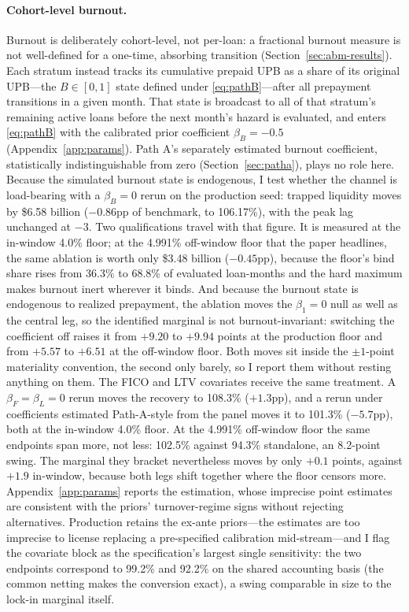 \documentclass[12pt]{article}
\begin{document}
\paragraph{Cohort-level burnout.}
Burnout is deliberately cohort-level, not per-loan: a fractional burnout measure is not well-defined for a one-time, absorbing transition (Section~\ref{sec:abm-results}). Each stratum instead tracks its cumulative prepaid UPB as a share of its original UPB---the $B \in [0,1]$ state defined under \eqref{eq:pathB}---after all prepayment transitions in a given month. That state is broadcast to all of that stratum's remaining active loans before the next month's hazard is evaluated, and enters \eqref{eq:pathB} with the calibrated prior coefficient $\beta_B = -0.5$ (Appendix~\ref{app:params}). Path A's separately estimated burnout coefficient, statistically indistinguishable from zero (Section~\ref{sec:patha}), plays no role here. Because the simulated burnout state is endogenous, I test whether the channel is load-bearing with a $\beta_B = 0$ rerun on the production seed: trapped liquidity moves by \$6.58 billion ($-0.86$pp of benchmark, to 106.17\%), with the peak lag unchanged at $-3$. Two qualifications travel with that figure. It is measured at the in-window 4.0\% floor; at the 4.991\% off-window floor that the paper headlines, the same ablation is worth only \$3.48 billion ($-0.45$pp), because the floor's bind share rises from 36.3\% to 68.8\% of evaluated loan-months and the hard maximum makes burnout inert wherever it binds. And because the burnout state is endogenous to realized prepayment, the ablation moves the $\beta_1 = 0$ null as well as the central leg, so the identified marginal is not burnout-invariant: switching the coefficient off raises it from $+9.20$ to $+9.94$ points at the production floor and from $+5.57$ to $+6.51$ at the off-window floor. Both moves sit inside the $\pm 1$-point materiality convention, the second only barely, so I report them without resting anything on them. The FICO and LTV covariates receive the same treatment. A $\beta_F = \beta_L = 0$ rerun moves the recovery to 108.3\% ($+1.3$pp), and a rerun under coefficients estimated Path-A-style from the panel moves it to 101.3\% ($-5.7$pp), both at the in-window 4.0\% floor. At the 4.991\% off-window floor the same endpoints span more, not less: 102.5\% against 94.3\% standalone, an 8.2-point swing. The marginal they bracket nevertheless moves by only $+0.1$ points, against $+1.9$ in-window, because both legs shift together where the floor censors more. Appendix~\ref{app:params} reports the estimation, whose imprecise point estimates are consistent with the priors' turnover-regime signs without rejecting alternatives. Production retains the ex-ante priors---the estimates are too imprecise to license replacing a pre-specified calibration mid-stream---and I flag the covariate block as the specification's largest single sensitivity: the two endpoints correspond to 99.2\% and 92.2\% on the shared accounting basis (the common netting makes the conversion exact), a swing comparable in size to the lock-in marginal itself.
\end{document}
